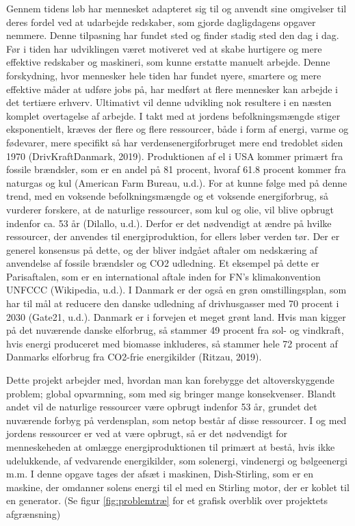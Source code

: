\documentclass[SRC.tex]{subfiles}
\begin{document}
	Gennem tidens løb har mennesket adapteret sig til og anvendt sine omgivelser til deres fordel ved at udarbejde redskaber, som gjorde dagligdagens opgaver nemmere. Denne tilpasning har fundet sted og finder stadig sted den dag i dag. Før i tiden har udviklingen været motiveret ved at skabe hurtigere og mere effektive redskaber og maskineri, som kunne erstatte manuelt arbejde. Denne forskydning, hvor mennesker hele tiden har fundet nyere, smartere og mere effektive måder at udføre jobs på, har medført at flere mennesker kan arbejde i det tertiære erhverv. Ultimativt vil denne udvikling nok resultere i en næsten komplet overtagelse af arbejde. I takt med at jordens befolkningsmængde stiger eksponentielt, kræves der flere og flere ressourcer, både i form af energi, varme og fødevarer, mere specifikt så har verdensenergiforbruget mere end tredoblet siden 1970 (DrivKraftDanmark, 2019). Produktionen af el i USA kommer primært fra fossile brændsler, som er en andel på 81 procent, hvoraf 61.8 procent kommer fra naturgas og kul (American Farm Bureau, u.d.). For at kunne følge med på denne trend, med en voksende befolkningsmængde og et voksende energiforbrug, så vurderer forskere, at de naturlige ressourcer, som kul og olie, vil blive opbrugt indenfor ca. 53 år (Dilallo, u.d.).  Derfor er det nødvendigt at ændre på hvilke ressourcer, der anvendes til energiproduktion, for ellers løber verden tør. Der er generel konsensus på dette, og der bliver indgået aftaler om nedskæring af anvendelse af fossile brændsler og CO2 udledning. Et eksempel på dette er Parisaftalen, som er en international aftale inden for FN’s klimakonvention UNFCCC (Wikipedia, u.d.). I Danmark er der også en grøn omstillingsplan, som har til mål at reducere den danske udledning af drivhusgasser med 70 procent i 2030 (Gate21, u.d.). Danmark er i forvejen et meget grønt land. Hvis man kigger på det nuværende danske elforbrug, så stammer 49 procent fra sol- og vindkraft, hvis energi produceret med biomasse inkluderes, så stammer hele 72 procent af Danmarks elforbrug fra CO2-frie energikilder (Ritzau, 2019).  
	
	Dette projekt arbejder med, hvordan man kan forebygge det altoverskyggende problem; global opvarmning, som med sig bringer mange konsekvenser. Blandt andet vil de naturlige ressourcer være opbrugt indenfor 53 år, grundet det nuværende forbyg på verdensplan, som netop består af disse ressourcer. I og med jordens ressourcer er ved at være opbrugt, så er det nødvendigt for menneskeheden at omlægge energiproduktionen til primært at bestå, hvis ikke udelukkende, af vedvarende energikilder, som solenergi, vindenergi og bølgeenergi m.m. I denne opgave tages der afsæt i maskinen, Dish-Stirling, som er en maskine, der omdanner solens energi til el med en Stirling motor, der er koblet til en generator. (Se figur \ref{fig:problemtræ} for et grafisk overblik over projektets afgrænsning) 
\end{document}
